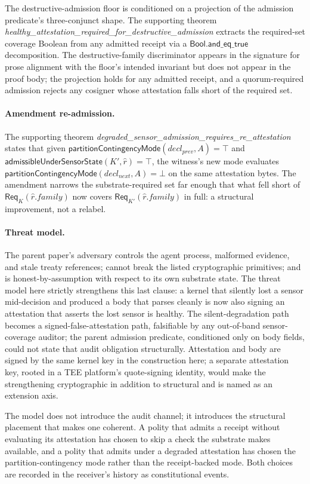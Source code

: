 The destructive-admission floor is conditioned on a projection of the admission predicate's three-conjunct shape. The supporting theorem \emph{healthy\_\allowbreak attestation\_\allowbreak required\_\allowbreak for\_\allowbreak destructive\_\allowbreak admission} extracts the required-set coverage Boolean from any admitted receipt via a $\mathsf{Bool.and\_eq\_true}$ decomposition. The destructive-family discriminator appears in the signature for prose alignment with the floor's intended invariant but does not appear in the proof body; the projection holds for any admitted receipt, and a quorum-required admission rejects any cosigner whose attestation falls short of the required set.

\paragraph{Amendment re-admission.}
The supporting theorem \emph{degraded\_\allowbreak sensor\_\allowbreak admission\_\allowbreak requires\_\allowbreak re\_\allowbreak attestation} states that given $\mathsf{partitionContingencyMode}(\mathit{decl}_{\mathit{prev}}, A) = \top$ and $\mathsf{admissibleUnderSensorState}(K', \hat r) = \top$, the witness's new mode evaluates $\mathsf{partitionContingencyMode}(\mathit{decl}_{\mathit{next}}, A) = \bot$ on the same attestation bytes. The amendment narrows the substrate-required set far enough that what fell short of $\mathsf{Req}_K(\hat r.\mathit{family})$ now covers $\mathsf{Req}_{K'}(\hat r.\mathit{family})$ in full: a structural improvement, not a relabel.

\paragraph{Threat model.}
The parent paper's adversary controls the agent process, malformed evidence, and stale treaty references; cannot break the listed cryptographic primitives; and is honest-by-assumption with respect to its own substrate state. The threat model here strictly strengthens this last clause: a kernel that silently lost a sensor mid-decision and produced a body that parses cleanly is now also signing an attestation that asserts the lost sensor is healthy. The silent-degradation path becomes a signed-false-attestation path, falsifiable by any out-of-band sensor-coverage auditor; the parent admission predicate, conditioned only on body fields, could not state that audit obligation structurally. Attestation and body are signed by the same kernel key in the construction here; a separate attestation key, rooted in a TEE platform's quote-signing identity, would make the strengthening cryptographic in addition to structural and is named as an extension axis.

The model does not introduce the audit channel; it introduces the structural placement that makes one coherent. A polity that admits a receipt without evaluating its attestation has chosen to skip a check the substrate makes available, and a polity that admits under a degraded attestation has chosen the partition-contingency mode rather than the receipt-backed mode. Both choices are recorded in the receiver's history as constitutional events.
